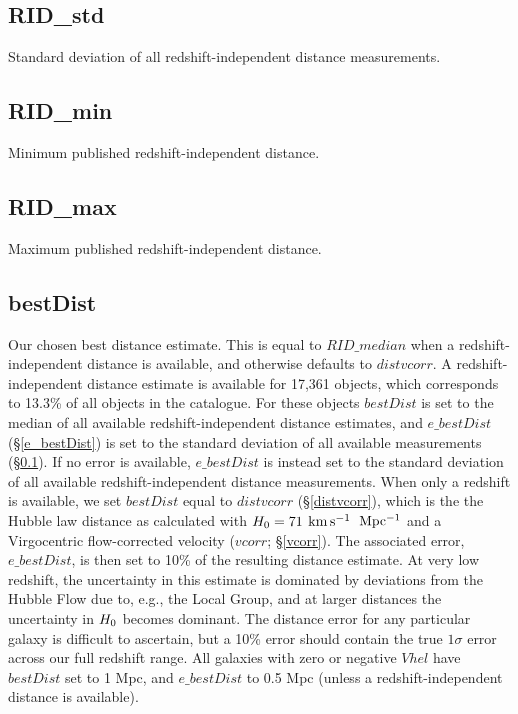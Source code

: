 \documentclass[twocolumn,tighten]{aastex62}
\newcommand{\kms}{$\rm km\, s^{-1}$}
\begin{document}
\subsection{RID\_std} \label{RID_std}
Standard deviation of all redshift-independent distance measurements.

\subsection{RID\_min} \label{RID_min}
Minimum published redshift-independent distance.

\subsection{RID\_max} \label{RID_max}
Maximum published redshift-independent distance.

\subsection{bestDist} \label{bestDist}
Our chosen best distance estimate. This is equal to $RID\_median$ when a redshift-independent distance is available, and otherwise defaults to $distvcorr$. A redshift-independent distance estimate is available for 17,361 objects, which corresponds to 13.3\% of all objects in the catalogue. For these objects $bestDist$ is set to the median of all available redshift-independent distance estimates, and $e\_bestDist$ (\S \ref{e_bestDist}) is set to the standard deviation of all available measurements (\S \ref{RID_std}). If no error is available, $e\_bestDist$ is instead set to the standard deviation of all available redshift-independent distance measurements. When only a redshift is available, we set $bestDist$ equal to $distvcorr$ (\S \ref{distvcorr}), which is the the Hubble law distance as calculated with $H_{\rm 0} = 71$ \kms~$\rm Mpc^{-1}$ and a Virgocentric flow-corrected velocity ($vcorr$; \S \ref{vcorr}). The associated error, $e\_bestDist$, is then set to 10\% of the resulting distance estimate. At very low redshift, the uncertainty in this estimate is dominated by deviations from the Hubble Flow due to, e.g., the Local Group, and at larger distances the uncertainty in $H_{\rm 0}$ becomes dominant. The distance error for any particular galaxy is difficult to ascertain, but a 10\% error should contain the true $1\sigma$ error across our full redshift range. All galaxies with zero or negative $Vhel$ have $bestDist$ set to 1 Mpc, and $e\_bestDist$ to 0.5 Mpc (unless a redshift-independent distance is available). 
\end{document}
